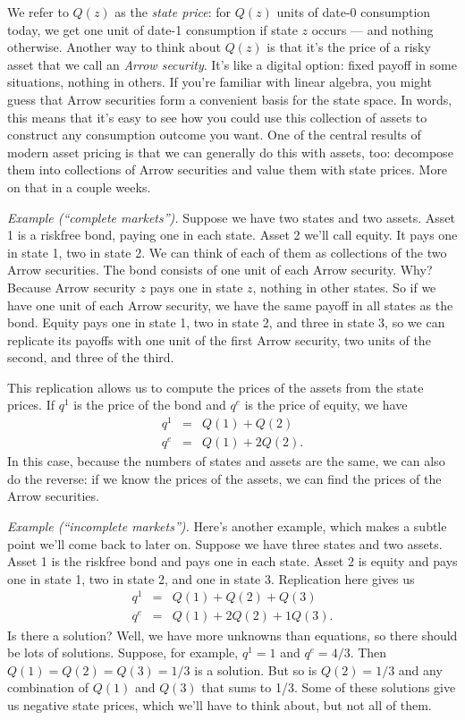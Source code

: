 \documentclass[11pt]{article}
\begin{document}
We refer to $Q(z)$ as the {\it state price\/}:
for $Q(z)$ units of date-0 consumption today, we get one
unit of date-1 consumption if state $z$ occurs --- and nothing otherwise.
Another way to think about $Q(z)$ is that it's the price of a risky asset
that we call an {\it Arrow security\/}.
It's like a digital option:  fixed payoff in some situations, nothing in others.
If you're familiar with linear algebra,
you might guess that {Arrow securities}
form a convenient basis for the state space.
In words, this means that it's easy to see how you could
use this collection of assets to construct any consumption outcome you want.
One of the central results of modern asset pricing is that
we can generally do this with assets, too:  decompose them
into collections of Arrow securities and value them with state prices.
More on that in a couple weeks.

{\it Example (``complete markets'').\/}
Suppose we have two states and two assets.
Asset 1 is a riskfree bond, paying one in each state.
Asset 2 we'll call equity.  It pays one in state 1, two in state 2.
We can think of each of them as collections of the two Arrow securities.
The bond consists of one unit of each Arrow security.
Why?  Because Arrow security $z$ pays one in state $z$, nothing in other states.
So if we have one unit of each Arrow security,
we have the same payoff in all states as the bond.
Equity pays one in state 1, two in state 2, and three in state 3,
so we can replicate its payoffs with one unit of the first Arrow security,
two units of the second, and three of the third.

This replication allows us to compute the prices of the assets from the state prices.
If $q^1$ is the price of the bond and $q^e$ is the price of equity, we have
\begin{eqnarray*}
    q^1 &=& Q(1) + Q(2) \\
    q^e &=& Q(1) + 2 Q(2) .
\end{eqnarray*}
In this case, because the numbers of states and assets are the same,
we can also do the reverse:  if we know the prices of the assets,
we can find the prices of the Arrow securities.


{\it Example  (``incomplete markets'').\/}
Here's another example, which makes a subtle point we'll come
back to later on.
Suppose we have three states and two assets.
Asset 1 is the riskfree bond and pays one in each state.
Asset 2 is equity and pays one in state 1, two in state 2, and one in state 3.
Replication here gives us
\begin{eqnarray*}
    q^1 &=& Q(1) + Q(2) + Q(3) \\
    q^e &=& Q(1) + 2 Q(2) + 1 Q(3) .
\end{eqnarray*}
Is there a solution?
Well, we have more unknowns than equations, so there
should be lots of solutions.
Suppose, for example, $q^1 = 1 $ and $q^e = 4/3$.
Then $ Q(1) = Q(2) = Q(3) = 1/3$ is a solution.
But so is $Q(2) = 1/3$ and any combination of $Q(1)$ and $Q(3)$ that sums to 1/3.
Some of these solutions give us negative state prices,
which we'll have to think about, but not all of them.
\end{document}
